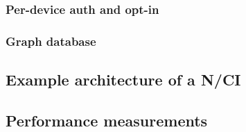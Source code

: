 \subsubsection{Per-device auth and opt-in}
\label{chapter5-user-side-opt-in}

\subsubsection{Graph database}
\label{chapter5-graph-database}


\subsection{Example architecture of a N/CI}
\label{chapter5-example-architecture-of-a-nci}





\subsection{Performance measurements}
\label{chapter5-performance-measurements}

